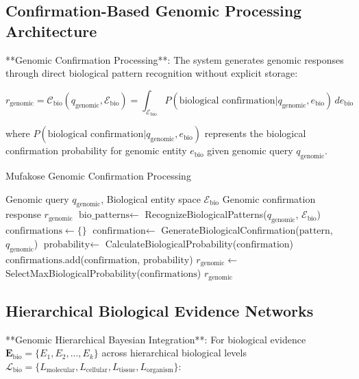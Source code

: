 \documentclass[12pt,a4paper]{article}
\begin{document}
\subsection{Confirmation-Based Genomic Processing Architecture}

**Genomic Confirmation Processing**: The system generates genomic responses through direct biological pattern recognition without explicit storage:

\begin{equation}
r_{\text{genomic}} = \mathcal{C}_{\text{bio}}(q_{\text{genomic}}, \mathcal{E}_{\text{bio}}) = \int_{\mathcal{E}_{\text{bio}}} P(\text{biological confirmation} | q_{\text{genomic}}, e_{\text{bio}}) \, de_{\text{bio}}
\end{equation}

where $P(\text{biological confirmation} | q_{\text{genomic}}, e_{\text{bio}})$ represents the biological confirmation probability for genomic entity $e_{\text{bio}}$ given genomic query $q_{\text{genomic}}$.

\begin{algorithm}
\caption{Mufakose Genomic Confirmation Processing}
\begin{algorithmic}[1]
\Require Genomic query $q_{\text{genomic}}$, Biological entity space $\mathcal{E}_{\text{bio}}$
\Ensure Genomic confirmation response $r_{\text{genomic}}$
\State $\text{bio\_patterns} \leftarrow$ RecognizeBiologicalPatterns($q_{\text{genomic}}$, $\mathcal{E}_{\text{bio}}$)
\State $\text{confirmations} \leftarrow \{\}$
    \State $\text{confirmation} \leftarrow$ GenerateBiologicalConfirmation($\text{pattern}$, $q_{\text{genomic}}$)
    \State $\text{probability} \leftarrow$ CalculateBiologicalProbability($\text{confirmation}$)
    \State $\text{confirmations}$.add($\text{confirmation}$, $\text{probability}$)
\EndFor
\State $r_{\text{genomic}} \leftarrow$ SelectMaxBiologicalProbability($\text{confirmations}$)
\Return $r_{\text{genomic}}$
\end{algorithmic}
\end{algorithm}

\subsection{Hierarchical Biological Evidence Networks}

**Genomic Hierarchical Bayesian Integration**: For biological evidence $\mathbf{E}_{\text{bio}} = \{E_1, E_2, ..., E_k\}$ across hierarchical biological levels $\mathcal{L}_{\text{bio}} = \{L_{\text{molecular}}, L_{\text{cellular}}, L_{\text{tissue}}, L_{\text{organism}}\}$:
\end{document}
